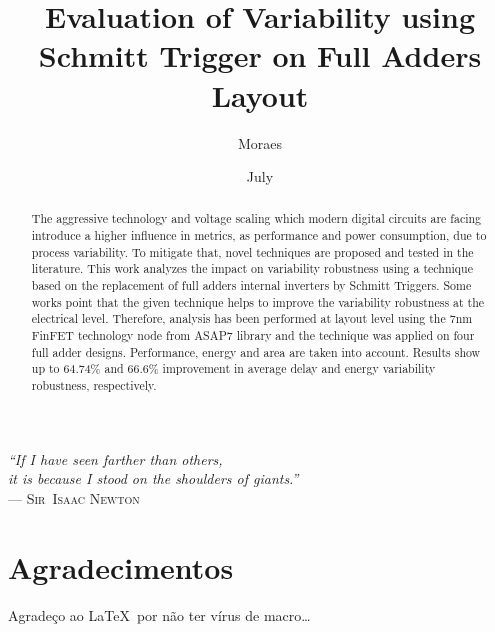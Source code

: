\documentclass[ecp,tc, english]{iiufrgs}
\title{Evaluation of Variability using Schmitt Trigger on Full Adders Layout}
\author{Moraes}{Leonardo Barlette de}
\date{July}{2018}
\begin{document}
\maketitle

\clearpage
\begin{flushright}
\mbox{}\vfill
{\sffamily\itshape
``If I have seen farther than others,\\
it is because I stood on the shoulders of giants.''\\}
--- \textsc{Sir~Isaac Newton}
\end{flushright}

\chapter*{Agradecimentos}
Agradeço ao \LaTeX\ por não ter vírus de macro\ldots



\begin{abstract}
    The aggressive technology and voltage scaling which modern digital circuits are facing introduce a higher influence in metrics, as performance and power consumption, due to process variability. To mitigate that, novel techniques are proposed and tested in the literature. This work analyzes the impact on variability robustness using a technique based on the replacement of full adders internal inverters by Schmitt Triggers. Some works point that the given technique helps to improve the variability robustness at the electrical level. Therefore, analysis has been performed at layout level using the 7nm FinFET technology node from ASAP7 library and the technique was applied on four full adder designs. Performance, energy and area are taken into account. Results show up to 64.74\% and 66.6\% improvement in average delay and energy variability robustness, respectively.
\end{abstract}

\end{document}
